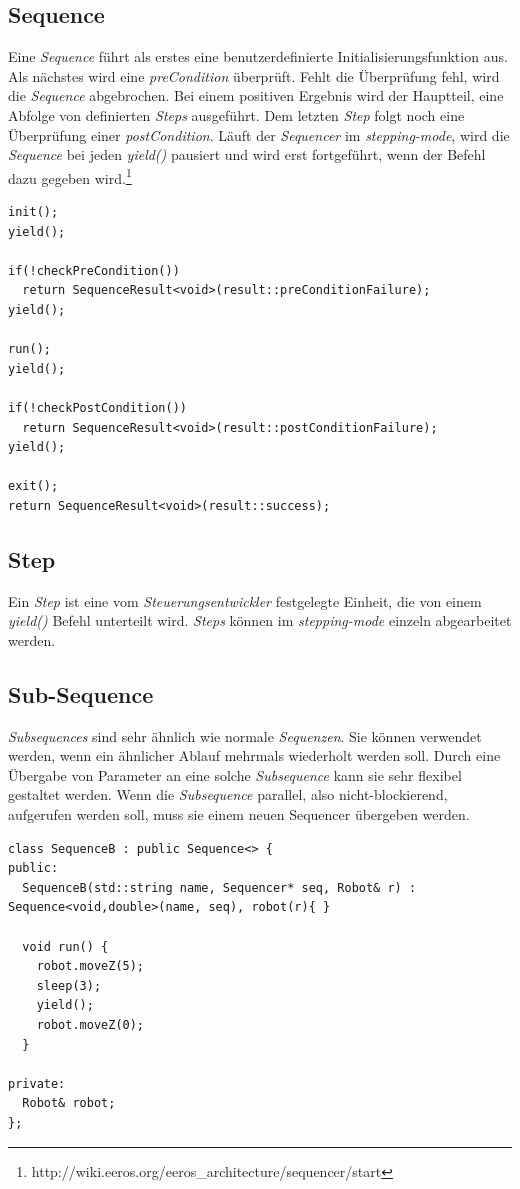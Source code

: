 \subsection{Sequence}
Eine \textit{Sequence} führt als erstes eine benutzerdefinierte Initialisierungsfunktion aus.
Als nächstes wird eine \textit{preCondition} überprüft.
Fehlt die Überprüfung fehl, wird die \textit{Sequence} abgebrochen.
Bei einem positiven Ergebnis wird der Hauptteil, eine Abfolge von definierten \textit{Steps} ausgeführt.
Dem letzten \textit{Step} folgt noch eine Überprüfung einer \textit{postCondition}.
Läuft der \textit{Sequencer} im \textit{stepping-mode}, wird die \textit{Sequence} bei jeden \textit{yield()} pausiert und wird erst fortgeführt, wenn der Befehl dazu gegeben wird.\footnote{http://wiki.eeros.org/eeros\_architecture/sequencer/start}

\begin{lstlisting}
init();
yield();

if(!checkPreCondition()) 
  return SequenceResult<void>(result::preConditionFailure);
yield();

run();
yield();

if(!checkPostCondition())
  return SequenceResult<void>(result::postConditionFailure);
yield();

exit();
return SequenceResult<void>(result::success);
\end{lstlisting}


\subsection{Step}
Ein \textit{Step} ist eine vom \textit{Steuerungsentwickler} festgelegte Einheit, die von einem \textit{yield()} Befehl unterteilt wird.
\textit{Steps} können im \textit{stepping-mode} einzeln abgearbeitet werden.


\subsection{Sub-Sequence}
\textit{Subsequences} sind sehr ähnlich wie normale \textit{Sequenzen}.
Sie können verwendet werden, wenn ein ähnlicher Ablauf mehrmals wiederholt werden soll.
Durch eine Übergabe von Parameter an eine solche \textit{Subsequence} kann sie sehr flexibel gestaltet werden.
Wenn die \textit{Subsequence} parallel, also nicht-blockierend, aufgerufen werden soll, muss sie einem neuen Sequencer übergeben werden.

\begin{lstlisting}
class SequenceB : public Sequence<> {
public:
  SequenceB(std::string name, Sequencer* seq, Robot& r) : Sequence<void,double>(name, seq), robot(r){ }
 
  void run() {
    robot.moveZ(5);
    sleep(3);
    yield();
    robot.moveZ(0);
  }
 
private: 
  Robot& robot;
};
\end{lstlisting}


